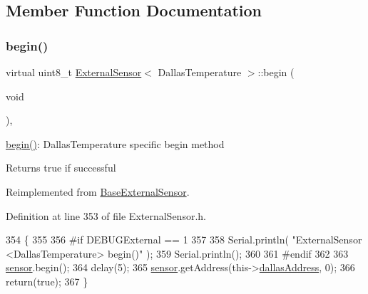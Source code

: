 \subsection{Member Function Documentation}
\mbox{\label{class_external_sensor_3_01_dallas_temperature_01_4_ac5275129b05e2ff8df45d5b222a661d9}} 
\subsubsection{\texorpdfstring{begin()}{begin()}}
{\footnotesize\ttfamily virtual uint8\+\_\+t \hyperlink{class_external_sensor}{External\+Sensor}$<$ Dallas\+Temperature $>$\+::begin (\begin{DoxyParamCaption}\item[{void}]{ }\end{DoxyParamCaption})\hspace{0.3cm}{\ttfamily [inline]}, {\ttfamily [virtual]}}

\hyperlink{class_external_sensor_3_01_dallas_temperature_01_4_ac5275129b05e2ff8df45d5b222a661d9}{begin()}\+: Dallas\+Temperature specific begin method

\begin{DoxyReturn}{Returns}
true if successful 
\end{DoxyReturn}


Reimplemented from \hyperlink{class_base_external_sensor_a87d132803d4f4fdd4e66332809f0c9a0}{Base\+External\+Sensor}.



Definition at line 353 of file External\+Sensor.\+h.


\begin{DoxyCode}
354     \{
355     
356 \textcolor{preprocessor}{    #if DEBUGExternal == 1 }
357 
358         Serial.println( \textcolor{stringliteral}{"ExternalSensor <DallasTemperature> begin()"} );
359         Serial.println();
360     
361 \textcolor{preprocessor}{    #endif}
362 
363         \hyperlink{class_external_sensor_3_01_dallas_temperature_01_4_adb6ba4fcdedef95ad8f6b0c9b6c0f9d1}{sensor}.begin(); 
364         delay(5);
365         \hyperlink{class_external_sensor_3_01_dallas_temperature_01_4_adb6ba4fcdedef95ad8f6b0c9b6c0f9d1}{sensor}.getAddress(this->\hyperlink{class_external_sensor_3_01_dallas_temperature_01_4_a7d9e9d2893e453638fcf440e5d8d9082}{dallasAddress}, 0);   
366         \textcolor{keywordflow}{return}(\textcolor{keyword}{true});
367     \}
\end{DoxyCode}
\mbox{\label{class_external_sensor_3_01_dallas_temperature_01_4_a1e725d9338314515d4e5dc456ed6a6c8}} 
